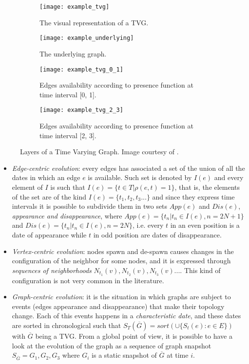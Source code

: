 	\begin{figure}
		\begin{subfigure}{0.5\textwidth}
			\centering
			\texttt{[image: example\_tvg]}
			\caption{The visual representation of a TVG.}
		\end{subfigure}
		\begin{subfigure}{0.5\textwidth}
			\centering
			\texttt{[image: example\_underlying]}
			\caption{The underlying graph.}
		\end{subfigure}
		\begin{subfigure}{0.5\textwidth}
			\centering
			\texttt{[image: example\_tvg\_0\_1]}
			\caption{Edges availability according to presence function at time interval [0, 1].}
		\end{subfigure}
		\begin{subfigure}{0.5\textwidth}
			\centering
			\texttt{[image: example\_tvg\_2\_3]}
			\caption{Edges availability according to presence function at time interval [2, 3].}
		\end{subfigure}
		\caption{Layers of a Time Varying Graph. Image courtesy of \cite{Casteigts2012}.}
	\end{figure}
	
	\begin{itemize}
		\item \textit{Edge-centric evolution}: every edges has associated a set of the union of all the dates in which an edge \(e\) is available. Such set is denoted by \(I(e)\) and every element of \(I\) is such that \(I(e) = \{t \in T | \rho(e,t) = 1\}\), that is, the elements of the set are of the kind \(I(e) = \{t_1, t_2, t_3 ... \}\) and since they express time intervals it is possible to subdivide them in two sets \(App(e)\) and \(Dis(e)\), \textit{appearance and disappearance}, where \(App(e) = \{t_n | t_n \in I(e), n = 2N + 1\}\) and \(Dis(e) = \{t_n | t_n \in I(e), n = 2N\}\), i.e. every \(t\) in an even position is a date of appearance while \(t\) in odd position are dates of disappearance.
		
		\item \textit{Vertex-centric evolution}: nodes spawn and de-spawn causes changes in the configuration of the neighbor for some nodes, and it is expressed through \textit{sequences of neighborhoods} \(N_{t_1}(v), N_{t_2}(v), N_{t_3}(v) ...\). This kind of configuration is not very common in the literature.
		
		\item \textit{Graph-centric evolution}: it is the situation in which graphs are subject to events (edges appearance and disappearance) that make their topology change. Each of this events happens in a \textit{characteristic date}, and these dates are sorted in chronological such that \(S_{T}(\overline{G}) = sort(\cup\{S_t(e) : e \in E\})\) with \( \overline{G}\) being a TVG. From a global point of view, it is possible to have a look at the evolution of the graph as a sequence of graph snapshot \(S_{\overline{G}} = G_1, G_2, G_3\) where \(G_i\) is a static snapshot of \(\overline{G}\) at time \(i\).
	\end{itemize}
	

